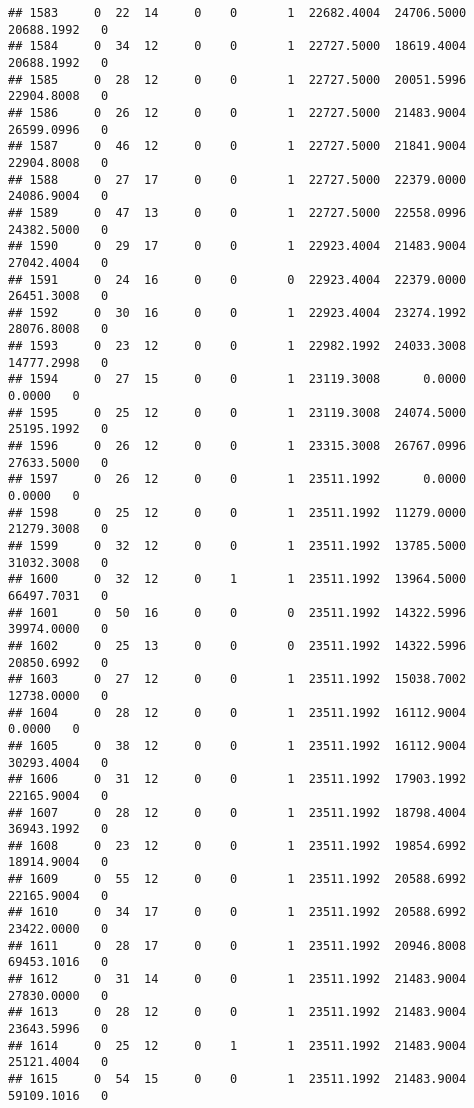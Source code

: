 \documentclass[
]{article}
\begin{document}
\begin{enumerate}
\begin{verbatim}
## 1583     0  22  14     0    0       1  22682.4004  24706.5000  20688.1992   0
## 1584     0  34  12     0    0       1  22727.5000  18619.4004  20688.1992   0
## 1585     0  28  12     0    0       1  22727.5000  20051.5996  22904.8008   0
## 1586     0  26  12     0    0       1  22727.5000  21483.9004  26599.0996   0
## 1587     0  46  12     0    0       1  22727.5000  21841.9004  22904.8008   0
## 1588     0  27  17     0    0       1  22727.5000  22379.0000  24086.9004   0
## 1589     0  47  13     0    0       1  22727.5000  22558.0996  24382.5000   0
## 1590     0  29  17     0    0       1  22923.4004  21483.9004  27042.4004   0
## 1591     0  24  16     0    0       0  22923.4004  22379.0000  26451.3008   0
## 1592     0  30  16     0    0       1  22923.4004  23274.1992  28076.8008   0
## 1593     0  23  12     0    0       1  22982.1992  24033.3008  14777.2998   0
## 1594     0  27  15     0    0       1  23119.3008      0.0000      0.0000   0
## 1595     0  25  12     0    0       1  23119.3008  24074.5000  25195.1992   0
## 1596     0  26  12     0    0       1  23315.3008  26767.0996  27633.5000   0
## 1597     0  26  12     0    0       1  23511.1992      0.0000      0.0000   0
## 1598     0  25  12     0    0       1  23511.1992  11279.0000  21279.3008   0
## 1599     0  32  12     0    0       1  23511.1992  13785.5000  31032.3008   0
## 1600     0  32  12     0    1       1  23511.1992  13964.5000  66497.7031   0
## 1601     0  50  16     0    0       0  23511.1992  14322.5996  39974.0000   0
## 1602     0  25  13     0    0       0  23511.1992  14322.5996  20850.6992   0
## 1603     0  27  12     0    0       1  23511.1992  15038.7002  12738.0000   0
## 1604     0  28  12     0    0       1  23511.1992  16112.9004      0.0000   0
## 1605     0  38  12     0    0       1  23511.1992  16112.9004  30293.4004   0
## 1606     0  31  12     0    0       1  23511.1992  17903.1992  22165.9004   0
## 1607     0  28  12     0    0       1  23511.1992  18798.4004  36943.1992   0
## 1608     0  23  12     0    0       1  23511.1992  19854.6992  18914.9004   0
## 1609     0  55  12     0    0       1  23511.1992  20588.6992  22165.9004   0
## 1610     0  34  17     0    0       1  23511.1992  20588.6992  23422.0000   0
## 1611     0  28  17     0    0       1  23511.1992  20946.8008  69453.1016   0
## 1612     0  31  14     0    0       1  23511.1992  21483.9004  27830.0000   0
## 1613     0  28  12     0    0       1  23511.1992  21483.9004  23643.5996   0
## 1614     0  25  12     0    1       1  23511.1992  21483.9004  25121.4004   0
## 1615     0  54  15     0    0       1  23511.1992  21483.9004  59109.1016   0

\end{verbatim}
\end{enumerate}
\end{document}
